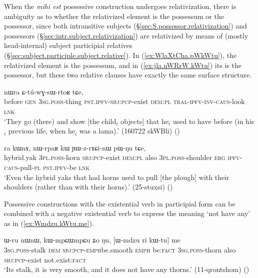  
When the \textit{mihi est} possessive construction undergoes relativization, there is ambiguity as to whether the relativized element is the possessum or the possessor, since both intransitive subjects (§\ref{sec:S.possessor.relativization}) and possessors (§\ref{sec:intr.subject.relativization}) are relativized by means of (mostly head-internal) subject participial relatives (§\ref{sec:subject.participle.subject.relative}). In (\ref{ex:WlaXtCha.pWkWtu}), the relativized element is the possessum, and in (\ref{ex:jla.nWRrW.kWtu}) its is the possessor, but these two relative clauses have exactly the same surface structure.
 
 \begin{exe}
\ex \label{ex:WlaXtCha.pWkWtu}
 nɯra ɕ-tú-wɣ-sɯ-rtoʁ tɕe, \\
before \textsc{gen} \textsc{3sg}.\textsc{poss}-thing \textsc{pst}.\textsc{ipfv}-\textsc{sbj}:\textsc{pcp}-exist \textsc{dem}:\textsc{pl} \textsc{tral}-\textsc{ipfv}-\textsc{inv}-\textsc{caus}-look \textsc{lnk} \\
\glt `They go (there) and show [the child$_i$ objects] that he$_i$ used to have before (in his$_i$ previous life, when he$_i$ was a lama).' (160722 skWBli)
()
 \end{exe}
 
\begin{exe}
\ex \label{ex:jla.nWRrW.kWtu}
 ra kɯnɤ, nɯ-rpaʁ kɯ ɲɯ-z-rɤɕi-nɯ pɯ-ŋu tɕe, \\
hybrid.yak \textsc{3pl}.\textsc{poss}-horn \textsc{sbj}:\textsc{pcp}-exist \textsc{dem}:\textsc{pl} also \textsc{3pl}.\textsc{poss}-shoulder \textsc{erg} \textsc{ipfv}-\textsc{caus}-pull-\textsc{pl} \textsc{pst}.\textsc{ipfv}-be \textsc{lnk} \\
\glt `Even the hybrid yaks that had horns used to pull [the plough] with their shoulders (rather than with their horns).' (25-stuxsi)
()
  \end{exe}


Possessive constructions with the existential verb  in participial form can be combined with a negative existential verb  to express the meaning `not have any' as in (\ref{ex:Wmdzu.kWtu.me}).
 
\begin{exe}
\ex \label{ex:Wmdzu.kWtu.me}
\gll  ɯ-ru nɯnɯ, kɯ-mpɕɯ\redp{}mpɕu ʑo ŋu, [ɯ-mdzu ri kɯ-tu] me \\
\textsc{3sg}.\textsc{poss}-stalk \textsc{dem} \textsc{sbj}:\textsc{pcp}-\textsc{emph}\redp{}be.smooth \textsc{emph} be:\textsc{fact} \textsc{3sg}.\textsc{poss}-thorn also \textsc{sbj}:\textsc{pcp}-exist not.exist:\textsc{fact} \\
\glt `Its stalk, it is very smooth, and it does not have any thorns.' (11-qrontshom)
()
\end{exe} 


